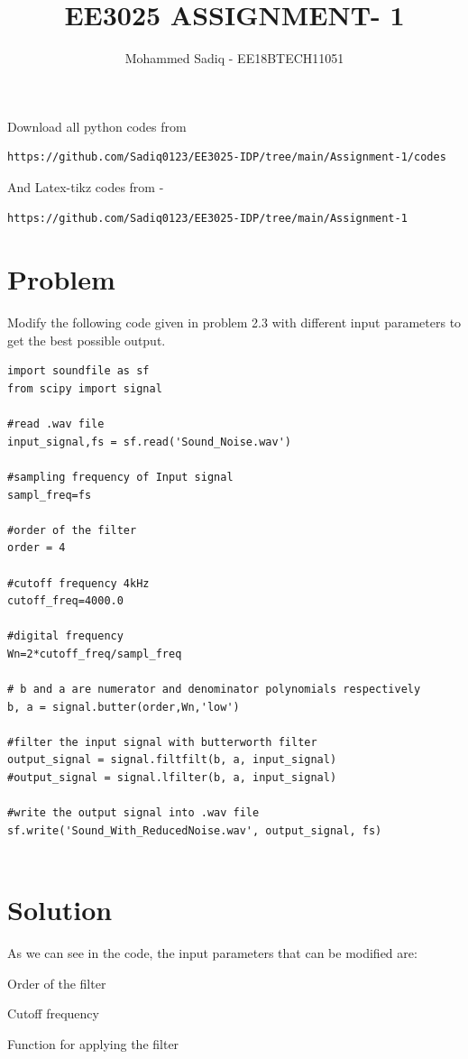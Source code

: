 \documentclass[journal,12pt,twocolumn]{IEEEtran}
\begin{document}
     \def\rightbox#1{\makebox[0in][r]{#1}}
     \def\centbox#1{\makebox[0in]{#1}}
     \def\topbox#1{\raisebox{-\baselineskip}[0in][0in]{#1}}
     \def\midbox#1{\raisebox{-0.5\baselineskip}[0in][0in]{#1}}
\vspace{3cm}
\title{EE3025 ASSIGNMENT- 1}
\author{Mohammed Sadiq - EE18BTECH11051}
\maketitle
\newpage
\bigskip
\renewcommand{\thefigure}{\theenumi}
\renewcommand{\thetable}{\theenumi}
Download all python codes from 
\begin{lstlisting}
https://github.com/Sadiq0123/EE3025-IDP/tree/main/Assignment-1/codes
\end{lstlisting}
And Latex-tikz codes from - 
\begin{lstlisting}
https://github.com/Sadiq0123/EE3025-IDP/tree/main/Assignment-1
\end{lstlisting}
%
\section{\textbf{Problem}}
    
Modify the following code given in problem 2.3 with different input parameters to get the best possible output.
\begin{lstlisting}
import soundfile as sf
from scipy import signal
    
#read .wav file
input_signal,fs = sf.read('Sound_Noise.wav')
    
#sampling frequency of Input signal
sampl_freq=fs
    
#order of the filter
order = 4
    
#cutoff frequency 4kHz
cutoff_freq=4000.0
    
#digital frequency
Wn=2*cutoff_freq/sampl_freq
    
# b and a are numerator and denominator polynomials respectively
b, a = signal.butter(order,Wn,'low')
    
#filter the input signal with butterworth filter
output_signal = signal.filtfilt(b, a, input_signal)
#output_signal = signal.lfilter(b, a, input_signal)
    
#write the output signal into .wav file
sf.write('Sound_With_ReducedNoise.wav', output_signal, fs)
    
\end{lstlisting}

  \section{\textbf{Solution}}
  As we can see in the code, the input parameters that can be modified are:
  \begin{description}[font=$\bullet$\scshape\bfseries]
  \item[]{Order of the filter}
  \item[]{Cutoff frequency}
  \item[]{Function for applying the filter}
  \end{description}
  
\end{document}
